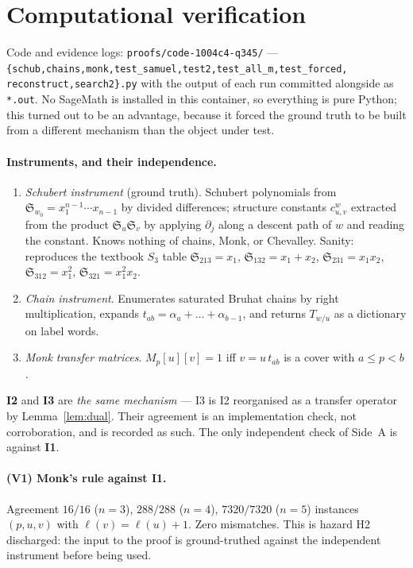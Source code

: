 \documentclass[11pt]{article}
\theoremstyle{plain}
\theoremstyle{definition}
\newcommand{\Sch}{\mathfrak{S}}
\DeclareMathOperator{\len}{\ell}
\begin{document}
\section{Computational verification}\label{sec:verif}

Code and evidence logs: \texttt{proofs/code-1004c4-q345/} ---
\texttt{\{schub,chains,monk,test\_samuel,test2,test\_all\_m,test\_forced,%
reconstruct,search2\}.py} with the output of each run committed alongside as
\texttt{*.out}. No SageMath is installed in this container, so everything is
pure Python; this turned out to be an advantage, because it forced the ground
truth to be built from a different mechanism than the object under test.

\paragraph{Instruments, and their independence.}
\begin{enumerate}
\item[\textbf{I1}] \emph{Schubert instrument} (ground truth). Schubert
polynomials from $\Sch_{w_{0}}=x_{1}^{n-1}\cdots x_{n-1}$ by divided
differences; structure constants $c^{w}_{u,v}$ extracted from the product
$\Sch_{u}\Sch_{v}$ by applying $\partial_{j}$ along a descent path of $w$ and
reading the constant. Knows nothing of chains, Monk, or Chevalley.
Sanity: reproduces the textbook $S_{3}$ table
$\Sch_{213}=x_{1}$, $\Sch_{132}=x_{1}+x_{2}$, $\Sch_{231}=x_{1}x_{2}$,
$\Sch_{312}=x_{1}^{2}$, $\Sch_{321}=x_{1}^{2}x_{2}$.
\item[\textbf{I2}] \emph{Chain instrument}. Enumerates saturated Bruhat chains
by right multiplication, expands $t_{ab}=\alpha_{a}+\dots+\alpha_{b-1}$, and
returns $T_{w/u}$ as a dictionary on label words.
\item[\textbf{I3}] \emph{Monk transfer matrices}. $M_{p}[u][v]=1$ iff
$v=u\,t_{ab}$ is a cover with $a\le p<b$.
\end{enumerate}
\textbf{I2} and \textbf{I3} are \emph{the same mechanism} --- I3 is I2
reorganised as a transfer operator by Lemma~\ref{lem:dual}. Their agreement is
an implementation check, not corroboration, and is recorded as such. The only
independent check of Side~A is against \textbf{I1}.

\paragraph{(V1) Monk's rule against I1.} Agreement $16/16$ ($n=3$),
$288/288$ ($n=4$), $7320/7320$ ($n=5$) instances $(p,u,v)$ with
$\len(v)=\len(u)+1$. Zero mismatches. This is hazard H2 discharged: the input
to the proof is ground-truthed against the independent instrument before being
used.
\end{document}

